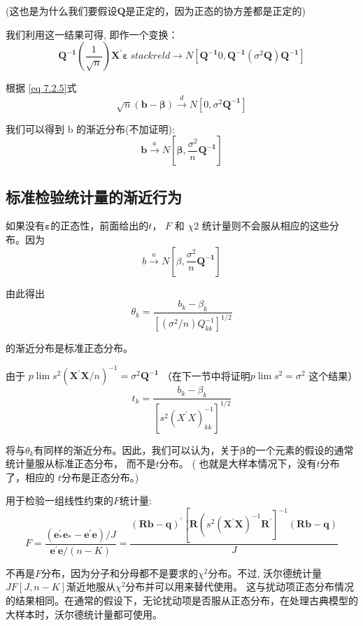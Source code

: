 (这也是为什么我们要假设$ \boldsymbol{Q} $是正定的，因为正态的协方差都是正定的)

我们利用这一结果可得, 即作一个变换：
$$ \boldsymbol{Q^{-1}} \left(\frac{1}{\sqrt{n}}\right) \boldsymbol{X^{\prime} \varepsilon} \
        stackrel{d}{\longrightarrow} N \left[ \boldsymbol{Q^{-1}} 0, \boldsymbol{Q^{-1}} \left(\sigma^{2} \boldsymbol{Q} \right) \boldsymbol{Q^{-1}}\right] $$

根据 \ref{eq 7.2.5}式
$$ \sqrt{n}(\boldsymbol{b-\beta}) \stackrel{d}{\longrightarrow} N\left[0, \sigma^{2} \boldsymbol{Q^{-1}} \right] $$

我们可以得到 b 的渐近分布(不加证明):
$$ \boldsymbol{b} \stackrel{a}{\longrightarrow} N \left[ \boldsymbol{\beta}, \frac{\sigma^{2}}{n} \boldsymbol{Q^{-1}}\right] $$

\subsection{标准检验统计量的渐近行为}
如果没有$ \boldsymbol{\varepsilon} $的正态性，前面给出的$ t $， $ F $ 和 $\chi{2}$  统计量则不会服从相应的这些分布。因为
$$ b \stackrel{a}{\longrightarrow} N \left[\beta, \frac{\sigma^{2}}{n} \boldsymbol{Q^{-1}} \right] $$

由此得出
$$ \theta_{k}=\frac{b_{k}-\beta_{k}}{\left[\left(\sigma^{2} / n\right) Q_{k k}^{-1}\right]^{1 / 2}} $$

的渐近分布是标准正态分布。

由于 $ p \lim s^{2}\left( \boldsymbol{X^{\prime} X} / n\right)^{-1}=\sigma^{2} \boldsymbol{Q^{-1}} $
（在下一节中将证明$ p \lim s^{2}=\sigma^{2} $ 这个结果）
$$ t_{k}=\frac{b_{k}-\beta_{k}}{\left[s^{2}\left(X^{\prime} X\right)_{k k}^{-1}\right]^{1 / 2}} $$

将与$ \theta_{k} $有同样的渐近分布。因此，我们可以认为，关于$ \boldsymbol{\beta} $的一个元素的假设的通常统计量服从标准正态分布，
而不是$ t $分布。 ( 也就是大样本情况下，没有$ t $分布了，相应的
$ t $分布是正态分布。)

用于检验一组线性约束的$ F $统计量:
$$ F=\frac{\left( \boldsymbol{e_{*}^{\prime} e_{*}-e^{\prime} e}\right) / J}
        {\boldsymbol{e^{\prime} e} /(n-K)}
        =\frac{(\boldsymbol{R b-q})^{\prime}\left[\boldsymbol{R}\left(s^{2}\left(\boldsymbol{X^{\prime} X}\right)^{-1} \boldsymbol{R^{\prime}}\right]^{-1}
        (\boldsymbol{R b-q})\right.}{J} $$

不再是$ F $分布，因为分子和分母都不是要求的$ \chi^{2} $分布。不过, 沃尔德统计量$ JF[J,n-K] $渐近地服从$ \chi^{2} $分布并可以用来替代使用。
这与扰动项正态分布情况的结果相同。在通常的假设下，无论扰动项是否服从正态分布，在处理古典模型的大样本时，沃尔德统计量都可使用。


